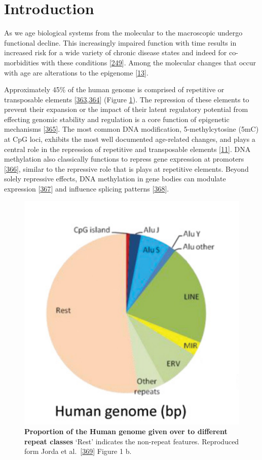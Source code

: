 \documentclass[
]{book}
\begin{document}
\hypertarget{AluIntro}{%
\section{Introduction}\label{AluIntro}}

As we age biological systems from the molecular to the macroscopic undergo functional decline.
This increasingly impaired function with time results in increased risk for a wide variety of chronic disease states and indeed for co-morbidities with these conditions {[}\protect\hyperlink{ref-Partridge2018}{249}{]}.
Among the molecular changes that occur with age are alterations to the epigenome {[}\protect\hyperlink{ref-Booth2016}{13}{]}.

Approximately 45\% of the human genome is comprised of repetitive or transposable elements {[}\protect\hyperlink{ref-Deniz2019}{363},\protect\hyperlink{ref-Kazazian2017}{364}{]} (Figure \ref{fig:propRepeats}).
The repression of these elements to prevent their expansion or the impact of their latent regulatory potential from effecting genomic stability and regulation is a core function of epigenetic mechanisms {[}\protect\hyperlink{ref-Gregory2005}{365}{]}.
The most common DNA modification, 5-methylcytosine (5mC) at CpG loci, exhibits the most well documented age-related changes, and plays a central role in the repression of repetitive and transposable elements {[}\protect\hyperlink{ref-Lopez-Otin2013}{11}{]}.
DNA methylation also classically functions to repress gene expression at promoters {[}\protect\hyperlink{ref-Deaton2011}{366}{]}, similar to the repressive role that is plays at repetitive elements.
Beyond solely repressive effects, DNA methylation in gene bodies can modulate expression {[}\protect\hyperlink{ref-Hellman2007}{367}{]} and influence splicing patterns {[}\protect\hyperlink{ref-Shukla2011}{368}{]}.

\begin{figure}

{\centering \includegraphics[width=0.4\linewidth]{./figs/Jorda_Peinado_prop_repeats} 

}

\caption{\textbf{Proportion of the Human genome given over to different repeat classes} `Rest' indicates the non-repeat features. Reproduced form Jorda et al.~{[}\protect\hyperlink{ref-Jorda2017}{369}{]} Figure 1 b.}\label{fig:propRepeats}
\end{figure}
\end{document}
